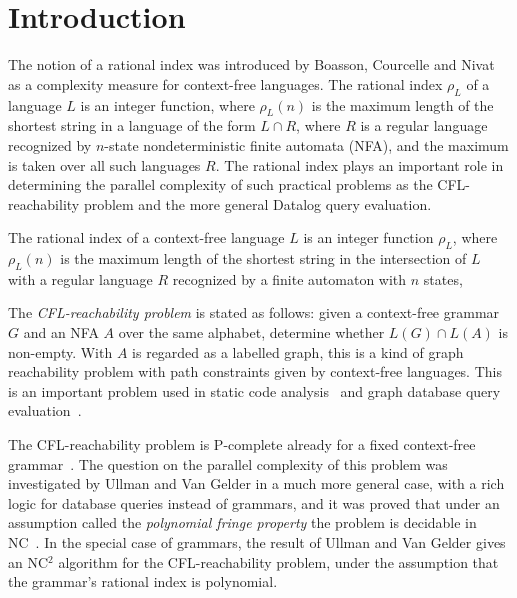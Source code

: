 \documentclass[runningheads]{llncs}
\begin{document}
\section{Introduction}\label{section_introduction}

The notion of a rational index was introduced by Boasson, Courcelle and Nivat~\cite{RatBasic}
as a complexity measure for context-free languages.
The rational index $\rho_L$ of a language $L$ is an integer function,
where $\rho_L(n)$ is the maximum length of the shortest string in a language of the form $L \cap R$,
where $R$ is a regular language recognized by $n$-state nondeterministic finite automata (NFA),
and the maximum is taken over all such languages $R$.
The rational index plays an important role
in determining the parallel complexity of such practical problems
as the CFL-reachability problem
and the more general Datalog query evaluation.

The rational index of a context-free language $L$ is an integer function $\rho_L$,
where $\rho_L(n)$ is the maximum length of the shortest string in the intersection of $L$
with a regular language $R$ recognized by a finite automaton with $n$ states,

The \emph{CFL-reachability problem} is stated as follows:
given a context-free grammar $G$
and an NFA $A$ over the same alphabet,
determine whether $L(G) \cap L(A)$ is non-empty.
With $A$ is regarded as a labelled graph,
this is a kind of graph reachability problem
with path constraints given by context-free languages.
This is an important problem used in static code analysis~\cite{RepsBasic}
and graph database query evaluation~\cite{Yannakakis}.

The CFL-reachability problem is P-complete
already for a fixed context-free grammar~\cite{PCompl}.
The question on the parallel complexity of this problem
was investigated by Ullman and Van Gelder \cite{Ullman}
in a much more general case,
with a rich logic for database queries instead of grammars,
and it was proved that under
an assumption called the \emph{polynomial fringe property}
the problem is decidable in NC~\cite{Ullman}.
In the special case of grammars,
the result of Ullman and Van Gelder \cite{Ullman}
gives an NC$^2$ algorithm for the CFL-reachability problem,
under the assumption that the grammar's rational index is polynomial.
\end{document}
